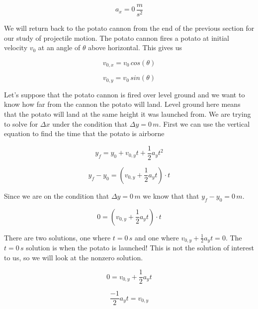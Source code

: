 \documentclass[12pt]{book}
\begin{document}
\begin{equation}
a_x = 0 \, \frac{m}{s^2}
\end{equation}

We will return back to the potato cannon from the end of the previous section for our study of projectile motion. The potato cannon fires a potato at initial velocity $v_0$ at an angle of $\theta$ above horizontal. This gives us

\begin{equation}
v_{0,x} = v_0 \, cos(\theta)
\end{equation}

\begin{equation}
v_{0,y} = v_0 \, sin(\theta)
\end{equation}

Let's suppose that the potato cannon is fired over level ground and we want to know how far from the cannon the potato will land. Level ground here means that the potato will land at the same height it was launched from. We are trying to solve for $\Delta x$ under the condition that $\Delta y = 0 \, m$. First we can use the vertical equation to find the time that the potato is airborne

\begin{equation}
y_f = y_0 + v_{0,y} t + \frac{1}{2} a_y t^2
\end{equation}

\begin{equation}
y_f - y_0 = (v_{0,y} + \frac{1}{2} a_y t) \cdot t
\end{equation}

Since we are on the condition that $\Delta y = 0 \, m$ we know that that $y_f - y_0 = 0 \, m$.

\begin{equation}
0 = (v_{0,y} + \frac{1}{2} a_y t) \cdot t
\end{equation}

There are two solutions, one where $t = 0 \, s$ and one where $v_{0,y} + \frac{1}{2} a_y t = 0$. The $t = 0 \, s$ solution is when the potato is launched! This is not the solution of interest to us, so we will look at the nonzero solution.

\begin{equation}
0 = v_{0,y} + \frac{1}{2} a_y t
\end{equation}

\begin{equation}
\frac{-1}{2} a_y t = v_{0,y}
\end{equation}
\end{document}
